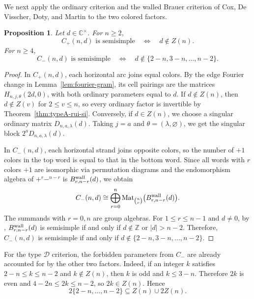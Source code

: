 \documentclass[11pt,a4paper]{amsart}
\newtheorem{proposition}[theorem]{Proposition}
\theoremstyle{uprightdefinition}
\theoremstyle{remark}\newtheorem{remark}[theorem]{Remark}
\begin{document}
We next apply the ordinary criterion and the walled Brauer criterion of
Cox, De Visscher, Doty, and Martin \cite[page~197, Theorem~6.3]{CDDM2008} to the two
colored factors.
\begin{proposition}\label{prop:colored-semisimplicity}
Let $d\in\mathbb C^\times$. For $n\ge2$,
\[
 C_+(n,d)\text{ is semisimple}\quad\Longleftrightarrow\quad d\notin Z(n).
\]
For $n\ge4$,
\[
 C_-(n,d)\text{ is semisimple}\quad\Longleftrightarrow\quad
 d\notin\{2-n,3-n,\ldots,n-2\}.
\]
\end{proposition}
\begin{proof}
In $C_+(n,d)$, each horizontal arc joins equal colors. By the edge Fourier
change in Lemma~\ref{lem:fourier-gram}, its cell pairings are the matrices
$H_{n,j,\theta}(2d,0)$, with both ordinary parameters equal to $d$.
If $d\notin Z(n)$, then $d\notin Z(v)$ for $2\le v\le n$, so every
ordinary factor is invertible by Theorem~\ref{thm:typeA-rui-si}.
Conversely, if $d\in Z(n)$, we choose a singular ordinary matrix
$D_{n,a,\lambda}(d)$. Taking $j=a$ and $\theta=(\lambda,\varnothing)$, we get
the singular block $2^aD_{n,a,\lambda}(d)$.

In $C_-(n,d)$, each horizontal strand joins opposite colors, so the number of
$+1$ colors in the top word is equal to that in the bottom word. Since all words
with $r$ colors $+1$ are isomorphic via permutation diagrams and the
endomorphism algebra of $+^r-^{n-r}$ is $B_{r,n-r}^{\rm wall}(d)$, we obtain
\begin{equation}\label{eq:D-walled-decomposition}
 C_-(n,d)\cong\bigoplus_{r=0}^n
 \operatorname{Mat}_{\binom nr}\bigl(B_{r,n-r}^{\rm wall}(d)\bigr).
\end{equation}
The summands with $r=0,n$ are group algebras. For $1\le r\le n-1$ and $d\ne0$,
by \cite[page~197, Theorem~6.3]{CDDM2008}, $B_{r,n-r}^{\rm wall}(d)$ is semisimple if and only if
$d\notin\mathbb Z$ or $|d|>n-2$. Therefore, $C_-(n,d)$ is semisimple
if and only if $d\notin\{2-n,3-n,\ldots,n-2\}$.
\end{proof}

For the type $\mathscr{D}$ criterion, the forbidden parameters from $C_-$ are
already accounted for by the other two factors. Indeed, if an integer $k$ satisfies $2-n\leq k\leq n-2$ and
$k\notin Z(n)$, then $k$ is odd and $k\leq3-n$. Therefore
$2k$ is even and $4-2n\leq2k\leq n-2$, so $2k\in Z(n)$. Hence
\[
 2\{2-n,\ldots,n-2\}\subseteq Z(n)\cup2Z(n).
\]
\end{document}
